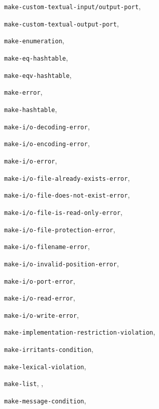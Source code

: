 {\begin{multicols}{2}
\texttt{make-custom-textual-input/output-port}, \textit{\pageref{io_s42}}
  
\texttt{make-custom-textual-output-port}, \textit{\pageref{io_s42}}
  
\texttt{make-enumeration}, \textit{\pageref{objects_s291}}
  
\texttt{make-eq-hashtable}, \textit{\pageref{objects_s274}}
  
\texttt{make-eqv-hashtable}, \textit{\pageref{objects_s275}}
  
\texttt{make-error}, \textit{\pageref{exceptions_s22}}
  
\texttt{make-hashtable}, \textit{\pageref{objects_s276}}
  
\texttt{make-i/o-decoding-error}, \textit{\pageref{exceptions_s42}}
  
\texttt{make-i/o-encoding-error}, \textit{\pageref{exceptions_s43}}
  
\texttt{make-i/o-error}, \textit{\pageref{exceptions_s32}}
  
\texttt{make-i/o-file-already-exists-error}, \textit{\pageref{exceptions_s39}}
  
\texttt{make-i/o-file-does-not-exist-error}, \textit{\pageref{exceptions_s40}}
  
\texttt{make-i/o-file-is-read-only-error}, \textit{\pageref{exceptions_s38}}
  
\texttt{make-i/o-file-protection-error}, \textit{\pageref{exceptions_s37}}
  
\texttt{make-i/o-filename-error}, \textit{\pageref{exceptions_s36}}
  
\texttt{make-i/o-invalid-position-error}, \textit{\pageref{exceptions_s35}}
  
\texttt{make-i/o-port-error}, \textit{\pageref{exceptions_s41}}
  
\texttt{make-i/o-read-error}, \textit{\pageref{exceptions_s33}}
  
\texttt{make-i/o-write-error}, \textit{\pageref{exceptions_s34}}
  
\texttt{make-implementation-restriction-violation}, \textit{\pageref{exceptions_s28}}
  
\texttt{make-irritants-condition}, \textit{\pageref{exceptions_s25}}
  
\texttt{make-lexical-violation}, \textit{\pageref{exceptions_s29}}
  
\texttt{make-list}, \pageref{start_s153}, \pageref{binding_s14}
  
\texttt{make-message-condition}, \textit{\pageref{exceptions_s24}}
  

\end{multicols}}
